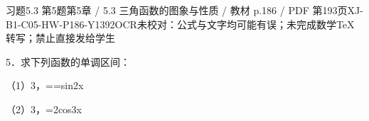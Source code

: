 \begin{bankitem}{习题5.3 第5题}{第5章 / 5.3 三角函数的图象与性质 / 教材 p.186 / PDF 第193页}{XJ-B1-C05-HW-P186-Y1392}{OCR未校对：公式与文字均可能有误；未完成数学TeX转写；禁止直接发给学生}
\begin{ocrdraft}
\par
5．求下列函数的单调区间：
\par
（1）3，==sin2x
\par
（2）3，=2cos3x
\end{ocrdraft}
\end{bankitem}
